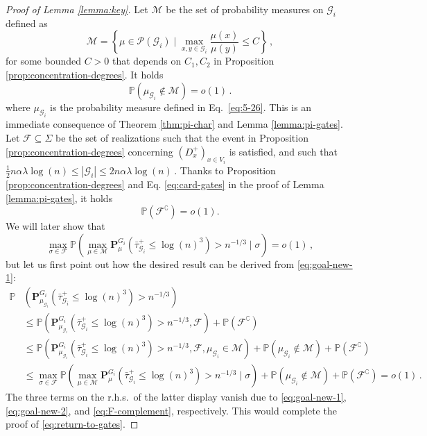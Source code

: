 \documentclass[11pt,oneside]{amsart}
\numberwithin{equation}{section}  %
\theoremstyle{plain}
\newcommand{\rhs}{{r.h.s.~}}
\newcommand{\p}{\mathbb{P}}
\newcommand{\quench}{\mathbf{P}}
\newcommand{\gates}{\mathcal{G}}
\newcommand{\mub}{\mu_{\gates_i}}
\begin{document}
\begin{proof}[Proof of Lemma \ref{lemma:key}]
		Let $\mathcal{M}$ be the set of probability measures on $\gates_i$ defined as
        \begin{equation} \label{eq:M}
			\mathcal{M}=\left\{\mu\in\mathcal{P}(\gates_i)\mid \max_{x,y\in\gates_i}\frac{\mu(x)}{\mu(y)}\le C \right\}\,,
		\end{equation}
		for some bounded $C>0$ that depends on $C_1, C_2$ in Proposition \ref{prop:concentration-degrees}. It holds
		\begin{equation}
			\label{eq:goal-new-2}
			\p(\mub\not\in\mathcal{M})=o(1)\,.
		\end{equation}
		where $\mub$ is the probability measure defined in Eq.~\eqref{eq:5-26}.
		This is an immediate consequence of Theorem \ref{thm:pi-char} and Lemma \ref{lemma:pi-gates}.
		Let $\mathcal{F}\subseteq\Sigma$ be the set of realizations such that the event in Proposition \ref{prop:concentration-degrees} concerning $(D_x^+)_{x\in V_i}$ is satisfied, and such that
		$\frac12 n\alpha\lambda\log(n)\le |\gates_i|\le 2n\alpha\lambda\log(n)\,.$
		Thanks to Proposition \ref{prop:concentration-degrees} and Eq. \eqref{eq:card-gates} in the proof of Lemma \ref{lemma:pi-gates}, it holds 
		\begin{equation} \label{eq:F-complement}
			\p(\mathcal{F}^\complement)=o(1).
		\end{equation}
		We will later show that
		\begin{equation}
			\label{eq:goal-new-1}
			\max_{\sigma\in\mathcal{F}}	\p\left(\max_{\mu\in\mathcal{M}}{\quench}^{G_i}_{\mu} (\bar\tau_{\gates_i}^+\le \log(n)^3) > n^{-1/3}\mid \sigma\right)=o(1)\,,
		\end{equation}
		but let us first point out how the desired result can be derived from  \eqref{eq:goal-new-1}:
		\begin{equation*}\label{eq:518}
			\begin{split}
				\p&\left({\quench}^{G_i}_{{\mub}} (\bar\tau_{\gates_i}^+\le \log(n)^3)>n^{-1/3}\right)\\
				&\le	\p\left({\quench}^{G_i}_{{\mub}} (\bar\tau_{\gates_i}^+\le \log(n)^3) >n^{-1/3} , \mathcal{F}\right)+\p(\mathcal{F}^\complement)\\
				&\le	\p\left({\quench}^{G_i}_{{\mub}} (\bar\tau_{\gates_i}^+\le \log(n)^3) >n^{-1/3} , \mathcal{F}, \mub\in\mathcal{M}\right)+\p(\mub\not\in\mathcal{M})+\p(\mathcal{F}^\complement)\\
				&\le \max_{\sigma\in\mathcal{F}}	\p\left(\max_{\mu\in\mathcal{M}}{\quench}^{G_i}_{{\mu}} (\bar\tau_{\gates_i}^+\le \log(n)^3) > n^{-1/3}\mid \sigma\right)+\p(\mub\not\in\mathcal{M})+\p(\mathcal{F}^\complement)
				=o(1)\,.
			\end{split}
		\end{equation*}
		The three terms on the \rhs of the latter display vanish due to \eqref{eq:goal-new-1}, \eqref{eq:goal-new-2}, and \eqref{eq:F-complement}, respectively. 
      This would complete the proof of \eqref{eq:return-to-gates}.
		

\end{proof}
\end{document}
